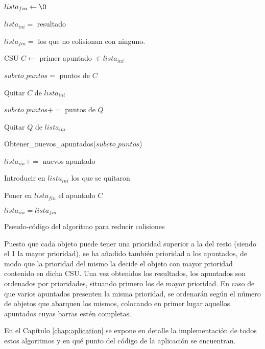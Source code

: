 \begin{algorithm}[H]
$lista_{fin} \leftarrow \O$

$lista_{ini} =$ resultado

 {

    $lista_{fin} =$ los que no colisionan con ninguno.

     {

        CSU $C \leftarrow$ primer apuntado $\in lista_{ini}$

        $subcto\_puntos = $ puntos de $C$

        Quitar $C$ de $lista_{ini}$

         {

             {

                $subcto\_puntos += $ puntos de $Q$

                Quitar $Q$ de $lista_{ini}$

            }

        }

         {

            Obtener\_nuevos\_apuntados($subcto\_puntos$)

             {$lista_{ini} +=$ nuevos apuntado } 
             {

                Introducir en $lista_{ini}$ los que se quitaron

                Poner en $lista_{fin}$ el apuntado $C$

             }

        }

    }

    $lista_{ini} = lista_{fin}$
}
\caption{Pseudo-código del algoritmo para reducir colisiones}
\label{alg:const3}
\end{algorithm}

Puesto que cada objeto puede tener una prioridad superior a la del resto (siendo
el 1 la mayor prioridad), se ha añadido también prioridad a los apuntados, de
modo que la prioridad del mismo la decide el objeto con mayor prioridad
contenido en dicha CSU. Una vez obtenidos los resultados, los apuntados son
ordenados por prioridades, situando primero los de mayor prioridad. 
En caso de que varios apuntados presenten la misma prioridad, se ordenarán según el número
de objetos que abarquen los mismos, colocando en primer lugar aquellos
apuntados cuyas barras estén completas.

En el Capítulo \ref{chap:aplication} se expone en detalle la implementación de todos
estos algoritmos y en qué punto del código de la aplicación se encuentran.

